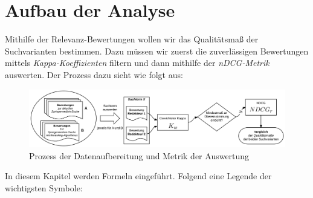 \section{Aufbau der Analyse}
\label{sec:Evaluation:Aufbau}

Mithilfe der Relevanz-Bewertungen wollen wir das Qualitätsmaß der Suchvarianten bestimmen. Dazu müssen wir zuerst die \glqq zuverlässigen\grqq{} Bewertungen mittels \textit{Kappa-Koeffizienten} filtern und dann mithilfe der \textit{nDCG-Metrik} auswerten. Der Prozess dazu sieht wie folgt aus:

\begin{figure}[H]
\centering
\vspace{-.5em}
\caption[Prozess der Datenaufbereitung und Metrik der Auswertung]{Prozess der Datenaufbereitung und Metrik der Auswertung}
\vspace{.5em}
\label{fig:SucheSpringerNature}
\includegraphics[width=\linewidth]{gfx/EvaluationDatenaufbereitung}
\vspace{-2em}
\end{figure}

\pagebreak

In diesem Kapitel werden Formeln eingeführt. Folgend eine Legende der wichtigsten Symbole:


